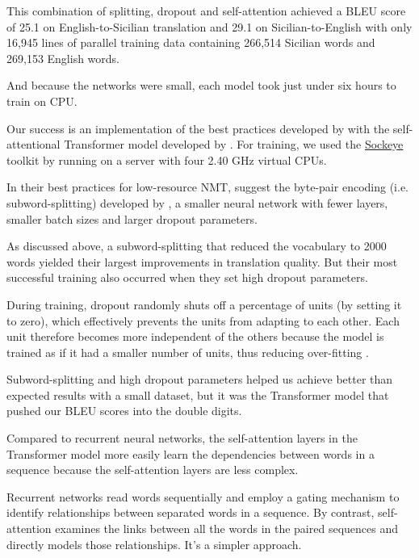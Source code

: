 \documentclass[10pt,letterpaper]{article}
\begin{document}
This combination of splitting, dropout and self-attention achieved a BLEU score of
25.1 on English-to-Sicilian translation and 29.1 on Sicilian-to-English with only 16,945 lines
of parallel training data containing 266,514 Sicilian words and 269,153 English words.

And because the networks were small, each model took just under six hours to train on CPU.
      
Our success is an implementation of the best practices developed by \citet{sennrich2019loresnmt}
with the self-attentional Transformer model developed by \citet{vaswani2017attention}.
For training, we used the \href{https://awslabs.github.io/sockeye/}{Sockeye} toolkit by
\citet{hieber2017sockeye} running on a server with four 2.40 GHz virtual CPUs.
      
In their best practices for low-resource NMT, \citeauthor{sennrich2019loresnmt}
suggest the byte-pair encoding (i.e. subword-splitting) developed by 
\citep{sennrich2016subword}, a smaller neural network with fewer layers,
smaller batch sizes and larger dropout parameters.





As discussed above, a subword-splitting that reduced the vocabulary to
2000 words yielded their largest improvements in translation quality.
But their most successful training also occurred when they set high dropout parameters.

During training, dropout randomly shuts off a percentage of units (by setting it to zero),
which effectively prevents the units from adapting to each other.
Each unit therefore becomes more independent of the others because the model is trained
as if it had a smaller number of units, thus reducing over-fitting
\citep{srivastava2014dropout}.

Subword-splitting and high dropout parameters helped us achieve better than expected results with
a small dataset, but it was the Transformer model that pushed our BLEU scores into the double digits.

Compared to recurrent neural networks, the self-attention layers in the Transformer model more easily
learn the dependencies between words in a sequence because the self-attention layers are less complex.

Recurrent networks read words sequentially and employ a gating mechanism to identify relationships
between separated words in a sequence.  By contrast, self-attention examines the links between all the words
in the paired sequences and directly models those relationships. It's a simpler approach.
      
\end{document}
